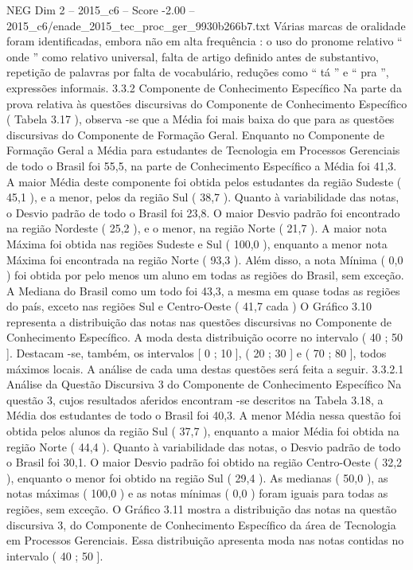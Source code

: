 \begin{textsample}{NEG Dim 2 – 2015\_c6 – Score -2.00 – 2015\_c6/enade\_2015\_tec\_proc\_ger\_9930b266b7.txt}
Várias marcas de oralidade foram identificadas, embora não em alta frequência : o uso do pronome relativo “ onde ” como relativo universal, falta de artigo definido antes de substantivo, repetição de palavras por falta de vocabulário, reduções como “ tá ” e “ pra ”, expressões informais. 3.3.2 Componente de Conhecimento Específico Na parte da prova relativa às questões discursivas do Componente de Conhecimento Específico ( Tabela 3.17 ), observa -se que a Média foi mais baixa do que para as questões discursivas do Componente de Formação Geral.
Enquanto no Componente de Formação Geral a Média para estudantes de Tecnologia em Processos Gerenciais de todo o Brasil foi 55,5, na parte de Conhecimento Específico a Média foi 41,3.
A maior Média deste componente foi obtida pelos estudantes da região Sudeste ( 45,1 ), e a menor, pelos da região Sul ( 38,7 ).
Quanto à variabilidade das notas, o Desvio padrão de todo o Brasil foi 23,8.
O maior Desvio padrão foi encontrado na região Nordeste ( 25,2 ), e o menor, na região Norte ( 21,7 ).
A maior nota Máxima foi obtida nas regiões Sudeste e Sul ( 100,0 ), enquanto a menor nota Máxima foi encontrada na região Norte ( 93,3 ).
Além disso, a nota Mínima ( 0,0 ) foi obtida por pelo menos um aluno em todas as regiões do Brasil, sem exceção.
A Mediana do Brasil como um todo foi 43,3, a mesma em quase todas as regiões do país, exceto nas regiões Sul e Centro-Oeste ( 41,7 cada ) O Gráfico 3.10 representa a distribuição das notas nas questões discursivas no Componente de Conhecimento Específico.
A moda desta distribuição ocorre no intervalo ( 40 ; 50 ].
Destacam -se, também, os intervalos [ 0 ; 10 ], ( 20 ; 30 ] e ( 70 ; 80 ], todos máximos locais.
A análise de cada uma destas questões será feita a seguir. 3.3.2.1 Análise da Questão Discursiva 3 do Componente de Conhecimento Específico Na questão 3, cujos resultados aferidos encontram -se descritos na Tabela 3.18, a Média dos estudantes de todo o Brasil foi 40,3.
A menor Média nessa questão foi obtida pelos alunos da região Sul ( 37,7 ), enquanto a maior Média foi obtida na região Norte ( 44,4 ).
Quanto à variabilidade das notas, o Desvio padrão de todo o Brasil foi 30,1.
O maior Desvio padrão foi obtido na região Centro-Oeste ( 32,2 ), enquanto o menor foi obtido na região Sul ( 29,4 ).
As medianas ( 50,0 ), as notas máximas ( 100,0 ) e as notas mínimas ( 0,0 ) foram iguais para todas as regiões, sem exceção.
O Gráfico 3.11 mostra a distribuição das notas na questão discursiva 3, do Componente de Conhecimento Específico da área de Tecnologia em Processos Gerenciais.
Essa distribuição apresenta moda nas notas contidas no intervalo ( 40 ; 50 ].

\end{textsample}
